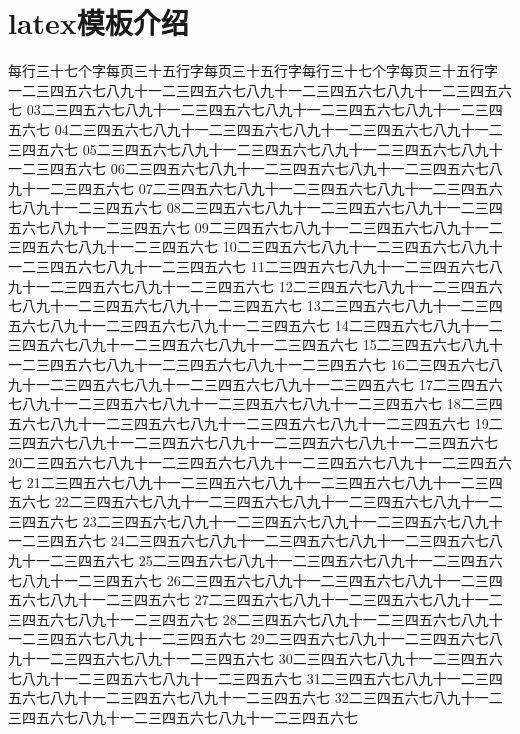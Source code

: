 \documentclass{standalone}
\begin{document}
\chapter{latex模板介绍}

每行三十七个字每页三十五行字每页三十五行字每行三十七个字每页三十五行字
一二三四五六七八九十一二三四五六七八九十一二三四五六七八九十一二三四五六七
03二三四五六七八九十一二三四五六七八九十一二三四五六七八九十一二三四五六七
04二三四五六七八九十一二三四五六七八九十一二三四五六七八九十一二三四五六七
05二三四五六七八九十一二三四五六七八九十一二三四五六七八九十一二三四五六七
06二三四五六七八九十一二三四五六七八九十一二三四五六七八九十一二三四五六七
07二三四五六七八九十一二三四五六七八九十一二三四五六七八九十一二三四五六七
08二三四五六七八九十一二三四五六七八九十一二三四五六七八九十一二三四五六七
09二三四五六七八九十一二三四五六七八九十一二三四五六七八九十一二三四五六七
10二三四五六七八九十一二三四五六七八九十一二三四五六七八九十一二三四五六七
11二三四五六七八九十一二三四五六七八九十一二三四五六七八九十一二三四五六七
12二三四五六七八九十一二三四五六七八九十一二三四五六七八九十一二三四五六七
13二三四五六七八九十一二三四五六七八九十一二三四五六七八九十一二三四五六七
14二三四五六七八九十一二三四五六七八九十一二三四五六七八九十一二三四五六七
15二三四五六七八九十一二三四五六七八九十一二三四五六七八九十一二三四五六七
16二三四五六七八九十一二三四五六七八九十一二三四五六七八九十一二三四五六七
17二三四五六七八九十一二三四五六七八九十一二三四五六七八九十一二三四五六七
18二三四五六七八九十一二三四五六七八九十一二三四五六七八九十一二三四五六七
19二三四五六七八九十一二三四五六七八九十一二三四五六七八九十一二三四五六七
20二三四五六七八九十一二三四五六七八九十一二三四五六七八九十一二三四五六七
21二三四五六七八九十一二三四五六七八九十一二三四五六七八九十一二三四五六七
22二三四五六七八九十一二三四五六七八九十一二三四五六七八九十一二三四五六七
23二三四五六七八九十一二三四五六七八九十一二三四五六七八九十一二三四五六七
24二三四五六七八九十一二三四五六七八九十一二三四五六七八九十一二三四五六七
25二三四五六七八九十一二三四五六七八九十一二三四五六七八九十一二三四五六七
26二三四五六七八九十一二三四五六七八九十一二三四五六七八九十一二三四五六七
27二三四五六七八九十一二三四五六七八九十一二三四五六七八九十一二三四五六七
28二三四五六七八九十一二三四五六七八九十一二三四五六七八九十一二三四五六七
29二三四五六七八九十一二三四五六七八九十一二三四五六七八九十一二三四五六七
30二三四五六七八九十一二三四五六七八九十一二三四五六七八九十一二三四五六七
31二三四五六七八九十一二三四五六七八九十一二三四五六七八九十一二三四五六七
32二三四五六七八九十一二三四五六七八九十一二三四五六七八九十一二三四五六七
\end{document}
